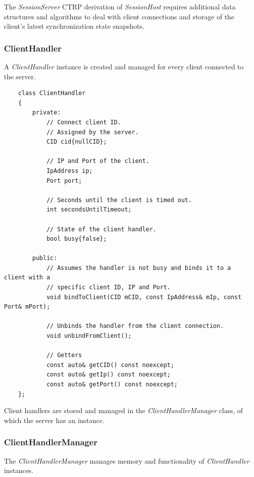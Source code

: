 \documentclass{report}
\begin{document}
                The \emph{SessionServer} CTRP derivation of \emph{SessionHost} requires additional data structures and algorithms to deal with client connections and storage of the client's latest synchronization state snapshots.

                \subsubsection{ClientHandler}

                    A \emph{ClientHandler} instance is created and managed for every client connected to the server.

\begin{verbatim}
    class ClientHandler
    {
        private:
            // Connect client ID. 
            // Assigned by the server.
            CID cid{nullCID};

            // IP and Port of the client.
            IpAddress ip;
            Port port;

            // Seconds until the client is timed out.
            int secondsUntilTimeout;
            
            // State of the client handler.
            bool busy{false};

        public:
            // Assumes the handler is not busy and binds it to a client with a
            // specific client ID, IP and Port.
            void bindToClient(CID mCID, const IpAddress& mIp, const Port& mPort);

            // Unbinds the handler from the client connection.
            void unbindFromClient();

            // Getters
            const auto& getCID() const noexcept;
            const auto& getIp() const noexcept;
            const auto& getPort() const noexcept;
    };
\end{verbatim}

                    Client handlers are stored and managed in the \emph{ClientHandlerManager} class, of which the server has an instance.

                \subsubsection{ClientHandlerManager}

                    The \emph{ClientHandlerManager} manages memory and functionality of \emph{ClientHandler} instances.
                    
\end{document}
